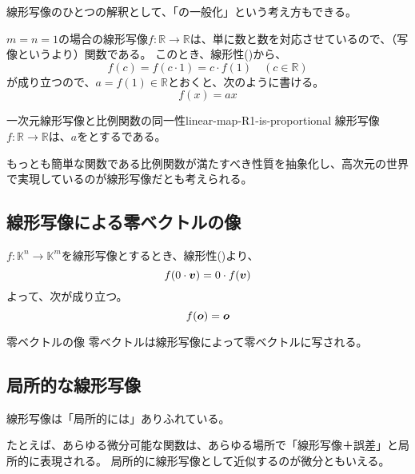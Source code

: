 \documentclass[../../../topic_linear-algebra]{subfiles}
\begin{document}
線形写像のひとつの解釈として、「の一般化」という考え方もできる。

\br

$m=n=1$の場合の線形写像$f\colon \mathbb{R} \to \mathbb{R}$は、単に数と数を対応させているので、（写像というより）関数である。
このとき、線形性()から、
\begin{equation*}
  f(c) = f(c \cdot 1) = c \cdot f(1) \quad (c \in \mathbb{R})
\end{equation*}
が成り立つので、$a = f(1) \in \mathbb{R}$とおくと、次のように書ける。
\begin{equation*}
  f(x) = ax
\end{equation*}

\begin{theorem}{一次元線形写像と比例関数の同一性}{linear-map-R1-is-proportional}
  線形写像$f\colon \mathbb{R} \to \mathbb{R}$は、$a$をとするである。
\end{theorem}

もっとも簡単な関数である比例関数が満たすべき性質を抽象化し、高次元の世界で実現しているのが線形写像だとも考えられる。

\subsection{線形写像による零ベクトルの像}

$f\colon \mathbb{K}^n \to \mathbb{K}^m$を線形写像とするとき、線形性()より、
\begin{equation*}
  f(0 \cdot \vb*{v}) = 0 \cdot f(\vb*{v})
\end{equation*}
よって、次が成り立つ。
\begin{equation*}
  f(\vb*{o}) = \vb*{o}
\end{equation*}

\begin{theorem*}{零ベクトルの像}
  零ベクトルは線形写像によって零ベクトルに写される。
\end{theorem*}

\subsection{局所的な線形写像}

線形写像は「局所的には」ありふれている。

\br

たとえば、あらゆる微分可能な関数は、あらゆる場所で「線形写像＋誤差」と局所的に表現される。
局所的に線形写像として近似するのが微分ともいえる。
\end{document}
